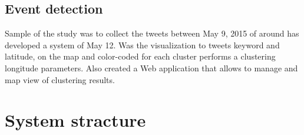 
\subsection{Event detection}
Sample of the study was to collect the tweets between May 9, 2015 of around has developed a system of May 12.
Was the visualization to tweets keyword and latitude, on the map and color-coded for each cluster performs a clustering longitude parameters.
Also created a Web application that allows to manage and map view of clustering results.



\newpage

\section{System stracture}
